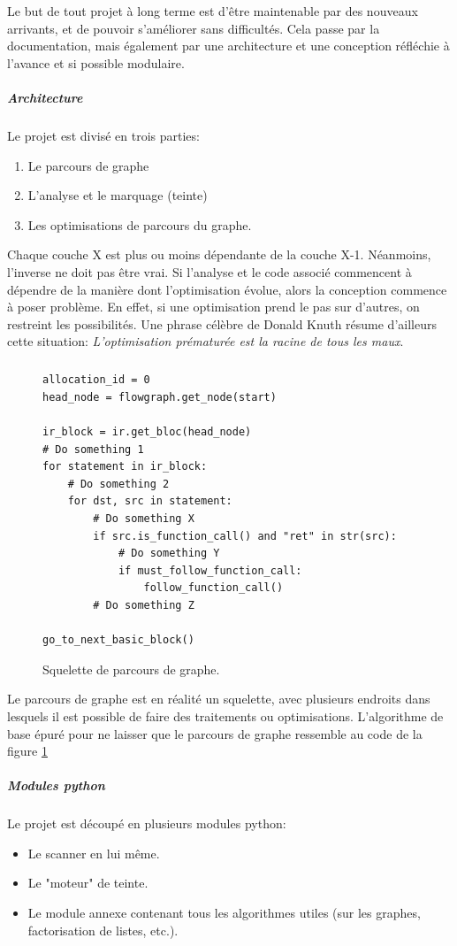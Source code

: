 Le but de tout projet à long terme est d'être maintenable par des nouveaux arrivants, et de pouvoir s'améliorer
sans difficultés. Cela passe par la documentation, mais également par une architecture et une conception réfléchie à l'avance
et si possible modulaire.
\newpage
\subparagraph{Architecture}
Le projet est divisé en trois parties:
\begin{enumerate}
        \item Le parcours de graphe
        \item L'analyse et le marquage (teinte)
        \item Les optimisations de parcours du graphe.
\end{enumerate}
Chaque couche X est plus ou moins dépendante de la couche X-1. Néanmoins, l'inverse ne doit pas être vrai.
Si l'analyse et le code associé commencent à dépendre de la manière dont l'optimisation évolue, alors la conception commence à poser problème.
En effet, si une optimisation prend le pas sur d'autres, on restreint les possibilités. Une phrase célèbre de Donald Knuth résume d'ailleurs cette situation:
\textit{L'optimisation prématurée est la racine de tous les maux}.
\subparagraph{}
\begin{figure}[h]
    \centering
    \begin {lstlisting}[frame=single]
allocation_id = 0
head_node = flowgraph.get_node(start)

ir_block = ir.get_bloc(head_node)
# Do something 1
for statement in ir_block:
    # Do something 2
    for dst, src in statement:
        # Do something X
        if src.is_function_call() and "ret" in str(src):
            # Do something Y
            if must_follow_function_call:
                follow_function_call()
        # Do something Z

go_to_next_basic_block()
    \end{lstlisting}
    \caption{Squelette de parcours de graphe.}
    \label{fig:graph-walk}
\end{figure}
Le parcours de graphe est en réalité un squelette, avec plusieurs endroits dans lesquels il est possible de faire des traitements ou optimisations. L'algorithme de base
épuré pour ne laisser que le parcours de graphe ressemble au code de la figure \ref{fig:graph-walk}
\newpage
\subparagraph{Modules python}
Le projet est découpé en plusieurs modules python:
\begin{itemize}
        \item Le scanner en lui même.
        \item Le "moteur" de teinte.
        \item Le module annexe contenant tous les algorithmes utiles (sur les graphes, factorisation de listes, etc.).
\end{itemize}

